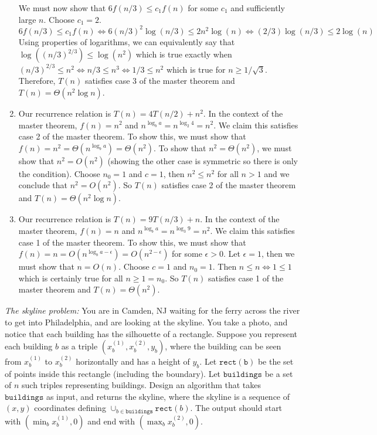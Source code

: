 \documentclass{article}
\begin{document}
\begin{enumerate}
    We must now show that $6 f(n/3) \leq c_1 f(n)$ for some $c_1$ and sufficiently large $n$.
    Choose $c_1 = 2$.
    $$ 6 f(n/3) \leq c_1 f(n) \iff 6 (n/3)^2 \log(n/3) \leq 2 n^2 \log(n) \iff (2/3) \log (n/3) \leq 2 \log (n) $$
    Using properties of logarithms, we can equivalently say that $\log ((n/3)^{2/3}) \leq \log (n^2)$ which is true exactly when $(n/3)^{2/3} \leq n^2 \iff n/3 \leq n^3 \iff 1/3 \leq n^2$ which is true for $n \geq 1/\sqrt{3}$. \parspace
    Therefore, $T(n)$ satisfies case 3 of the master theorem and $T(n) = \Theta (n^2 \log n)$.
    \item Our recurrence relation is $T(n) = 4T(n/2) + n^2$.
    In the context of the master theorem, $f(n) = n^2$ and $n^{\log_b a} = n^{\log_2 4} = n^2$.
    We claim this satisfies case 2 of the master theorem.
    To show this, we must show that $f(n) = n^2 = \Theta (n^{\log_b a}) = \Theta (n^2)$. \parspace
    To show that $n^2 = \Theta (n^2)$, we must show that $n^2 = O(n^2)$ (showing the other case is symmetric so there is only the condition).
    Choose $n_0 = 1$ and $c = 1$, then $n^2 \leq n^2$ for all $n > 1$ and we conclude that $n^2 = O(n^2)$. \parspace
    So $T(n)$ satisfies case 2 of the master theorem and $T(n) = \Theta (n^2 \log n)$.
    \item Our recurrence relation is $T(n) = 9T(n/3) + n$.
    In the context of the master theorem, $f(n) = n$ and $n^{\log_b a} = n^{\log_3 9} = n^2$.
    We claim this satisfies case 1 of the master theorem.
    To show this, we must show that $f(n) = n = O(n^{\log_b a - \epsilon}) = O(n^{2 - \epsilon})$ for some $\epsilon > 0$. \parspace
    Let $\epsilon = 1$, then we must show that $n = O(n)$.
    Choose $c = 1$ and $n_0 = 1$.
    Then $n \leq n \iff 1 \leq 1$ which is certainly true for all $n \geq 1 = n_0$.
    So $T(n)$ satisfies case 1 of the master theorem and $T(n) = \Theta (n^2)$.
\end{enumerate}


\nextprob
{}

\emph{The skyline problem:} You are in Camden, NJ waiting for the ferry across the river to
get into Philadelphia, and are looking at the skyline.  You take a photo, and notice that each building
has the silhouette of a rectangle.  Suppose you  represent each building $b$ as a
triple $(x_b^{(1)},x_b^{(2)},y_b)$, where the building can be seen from $x_b^{(1)}$ to $x_b^{(2)}$
horizontally and has a height of $y_b$.  Let $\mathtt{rect(b)}$ be the set of
points inside this rectangle (including the boundary).  Let $\mathtt{buildings}$
be a set of $n$ such triples representing buildings. Design an algorithm that takes $\mathtt{buildings}$ as input, and
returns the skyline, where the skyline is a sequence of~$(x,y)$ coordinates
defining $\cup_{b \in \mathtt{buildings}} \mathtt{rect}(b)$.  The output should
start with $(\min_b{x_b^{(1)}},0)$ and end with $(\max_b{x_b^{(2)}},0)$.
\end{document}
